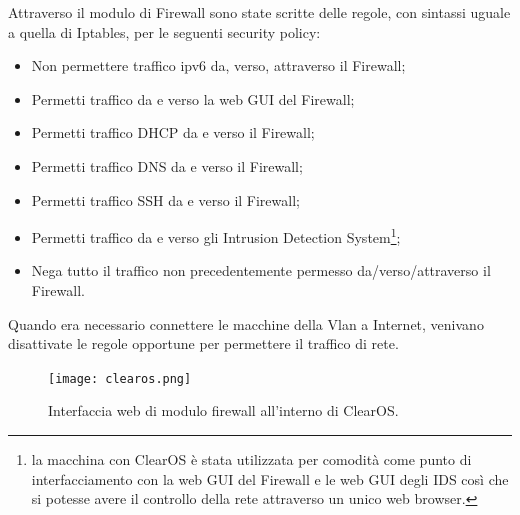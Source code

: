 Attraverso il modulo di Firewall sono state scritte delle regole, con sintassi uguale a quella di Iptables, per le seguenti security policy:
\begin{itemize}
    \item Non permettere traffico ipv6 da, verso, attraverso il Firewall;
    \item Permetti traffico  da e verso la web GUI del Firewall;
    \item Permetti traffico  DHCP da e verso il Firewall;
    \item Permetti traffico  DNS da e verso il Firewall;
    \item Permetti traffico  SSH da e verso il Firewall;
    \item Permetti traffico da e verso gli Intrusion Detection System\footnote{la macchina con ClearOS è stata utilizzata per comodità come  punto di interfacciamento con la web GUI del Firewall e le web GUI degli IDS così che si potesse avere il controllo della rete attraverso un unico web browser.};
    \item Nega tutto il traffico non precedentemente permesso da/verso/attraverso il Firewall.
\end{itemize}

Quando era necessario connettere le macchine della Vlan a Internet, venivano disattivate le regole opportune per permettere il traffico di rete. 
\begin{figure}[hbtp]
    \centering
    \texttt{[image: clearos.png]}
    \caption{Interfaccia web di modulo firewall all'interno di ClearOS.}
    \label{fig:clearos}
\end{figure}

